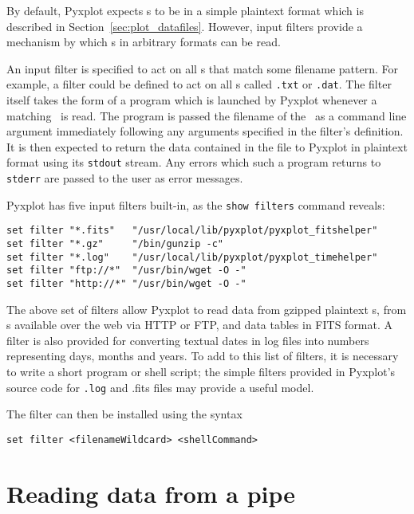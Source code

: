 By default, Pyxplot expects \datafile s to be in a simple plaintext format
which is described in Section~\ref{sec:plot_datafiles}. However, input filters
provide a mechanism by which \datafile s in arbitrary formats can be read.

An input filter is specified to act on all \datafile s that match some
filename pattern. For example, a filter could be defined to act on all
\datafile s called {\tt *.txt} or {\tt *.dat}. The filter itself takes the form
of a program which is launched by Pyxplot whenever a matching \datafile\ is
read.  The program is passed the filename of the \datafile\ as a command line
argument immediately following any arguments specified in the filter's
definition. It is then expected to return the data contained in the file to
Pyxplot in plaintext format using its {\tt stdout} stream. Any errors which
such a program returns to {\tt stderr} are passed to the user as error
messages.

Pyxplot has five input filters built-in, as the {\tt show filters} command
reveals:

\begin{verbatim}
set filter "*.fits"   "/usr/local/lib/pyxplot/pyxplot_fitshelper"
set filter "*.gz"     "/bin/gunzip -c"
set filter "*.log"    "/usr/local/lib/pyxplot/pyxplot_timehelper"
set filter "ftp://*"  "/usr/bin/wget -O -"
set filter "http://*" "/usr/bin/wget -O -"
\end{verbatim}

The above set of filters allow Pyxplot to read data from gzipped plaintext
\datafile s, from \datafile s available over the web via HTTP or
FTP, and data tables in FITS format.  A filter is
also provided for converting textual dates in log files into numbers
representing days, months and years. To add to this list of filters, it is
necessary to write a short program or shell script; the simple filters provided
in Pyxplot's source code for {\tt .log} and {.fits} files may provide a useful
model.

The filter can then be installed using the syntax

\begin{verbatim}
set filter <filenameWildcard> <shellCommand>
\end{verbatim}


\section{Reading data from a pipe}

